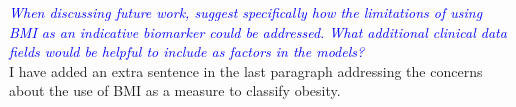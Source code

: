 \documentclass[a4paper, 12pt]{article}
\begin{document}
\noindent
\textcolor{blue}{
	\textit{When discussing future work, suggest specifically how the limitations of using BMI as an indicative biomarker could be addressed.
	What additional clinical data fields would be helpful to include as factors in the models?
	}
}\\

\noindent
I have added an extra sentence in the last paragraph addressing the concerns about the use of BMI as a measure to classify obesity.
\\
\end{document}
